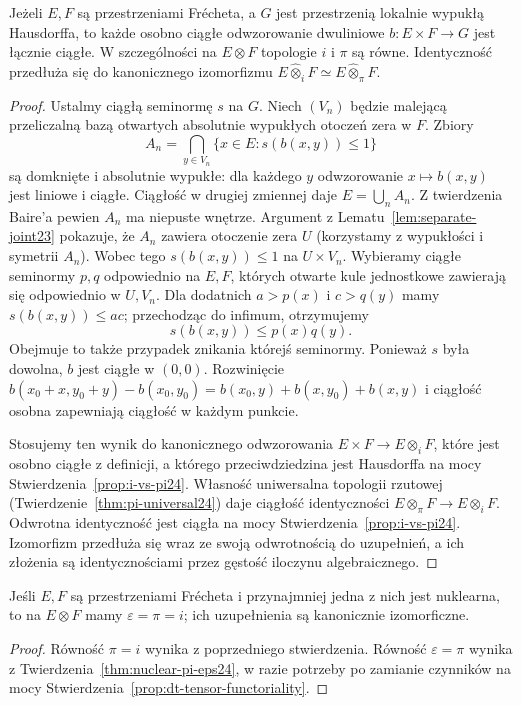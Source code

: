 \begin{stwierdzenie}
\label{prop:dt-i-pi-frechet}
Jeżeli $E,F$ są przestrzeniami Frécheta, a $G$ jest
przestrzenią lokalnie wypukłą Hausdorffa, to każde
osobno ciągłe odwzorowanie dwuliniowe $b:E\times F\to G$
jest łącznie ciągłe. W szczególności na $E\otimes F$
topologie $i$ i $\pi$ są równe. Identyczność przedłuża
się do kanonicznego izomorfizmu
$E\widehat\otimes_i F\simeq E\widehat\otimes_\pi F$.
\end{stwierdzenie}
\begin{proof}
Ustalmy ciągłą seminormę $s$ na $G$. Niech
$(V_n)$ będzie malejącą przeliczalną bazą otwartych
absolutnie wypukłych otoczeń zera w $F$. Zbiory
\[
 A_n=\bigcap_{y\in V_n}\{x\in E:s(b(x,y))\le1\}
\]
są domknięte i absolutnie wypukłe: dla każdego $y$
odwzorowanie $x\mapsto b(x,y)$ jest liniowe i ciągłe.
Ciągłość w drugiej zmiennej daje $E=\bigcup_n A_n$.
Z twierdzenia Baire'a pewien $A_n$ ma niepuste wnętrze.
Argument z Lematu~\ref{lem:separate-joint23} pokazuje,
że $A_n$ zawiera otoczenie zera $U$ (korzystamy
z wypukłości i symetrii $A_n$).
Wobec tego $s(b(x,y))\le1$ na $U\times V_n$.
Wybieramy ciągłe seminormy $p,q$ odpowiednio na $E,F$,
których otwarte kule jednostkowe zawierają się
odpowiednio w $U,V_n$. Dla dodatnich $a>p(x)$
i $c>q(y)$ mamy $s(b(x,y))\le ac$; przechodząc
do infimum, otrzymujemy
\[
 s(b(x,y))\le p(x)q(y).
\]
Obejmuje to także przypadek znikania którejś seminormy.
Ponieważ $s$ była dowolna, $b$ jest ciągłe w $(0,0)$.
Rozwinięcie
$b(x_0+x,y_0+y)-b(x_0,y_0)
=b(x_0,y)+b(x,y_0)+b(x,y)$
i ciągłość osobna zapewniają ciągłość w każdym punkcie.

Stosujemy ten wynik do kanonicznego odwzorowania
$E\times F\to E\otimes_i F$, które jest osobno ciągłe
z definicji, a którego przeciwdziedzina jest Hausdorffa
na mocy Stwierdzenia~\ref{prop:i-vs-pi24}.
Własność uniwersalna topologii rzutowej
(Twierdzenie~\ref{thm:pi-universal24}) daje ciągłość
identyczności $E\otimes_\pi F\to E\otimes_i F$.
Odwrotna identyczność jest ciągła na mocy
Stwierdzenia~\ref{prop:i-vs-pi24}.
Izomorfizm przedłuża się wraz ze swoją odwrotnością
do uzupełnień, a ich złożenia są identycznościami
przez gęstość iloczynu algebraicznego.
\end{proof}

\begin{wniosek}
\label{cor:dt-three-tensor-frechet}
Jeśli $E,F$ są przestrzeniami Frécheta i przynajmniej
jedna z nich jest nuklearna, to na $E\otimes F$
mamy $\varepsilon=\pi=i$; ich uzupełnienia są
kanonicznie izomorficzne.
\end{wniosek}
\begin{proof}
Równość $\pi=i$ wynika z poprzedniego stwierdzenia.
Równość $\varepsilon=\pi$ wynika z
Twierdzenia~\ref{thm:nuclear-pi-eps24}, w razie potrzeby
po zamianie czynników na mocy
Stwierdzenia~\ref{prop:dt-tensor-functoriality}.
\end{proof}

